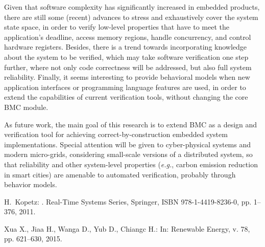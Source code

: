 \documentclass{acm_sen_article}
\begin{document}
{Given that software complexity has significantly increased in embedded products, there are still some (recent) advances to stress and exhaustively cover the system state space, in order to verify low-level properties that have to meet the application's deadline, access memory regions, handle concurrency, and control hardware registers. Besides, there is a trend towards incorporating knowledge about the system to be verified, which may take software verification one step further, where not only code correctness will be addressed, but also full system reliability. Finally, it seems interesting to provide behavioral models when new application interfaces or programming language features are used, in order to extend the capabilities of current verification tools, without changing the core BMC module.

As future work, the main goal of this research is to extend BMC as a design and verification tool for achieving correct-by-construction embedded system implementations. Special attention will be given to cyber-physical systems and modern micro-grids, considering small-scale versions of a distributed system, so that reliability and other system-level properties ({\it e.g.}, carbon emission reduction in smart cities) are amenable to automated verification, probably through behavior models.









\begin{thebibliography}{1}

H.~Kopetz:
.
\newblock Real-Time Systems Series, Springer, ISBN 978-1-4419-8236-0, pp. 1--376, 2011.

Xua X., Jiaa H., Wanga D., Yub D., Chiangc H.:
\newblock In: Renewable Energy, v. 78, pp. 621--630, 2015.


\end{thebibliography}}
\end{document}
